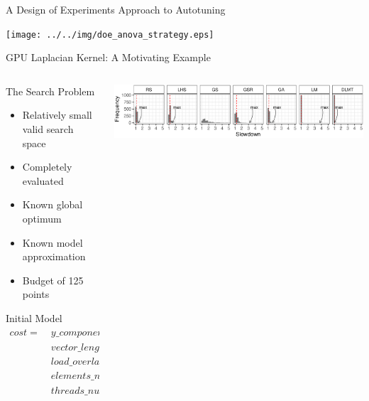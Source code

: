 \documentclass[10pt, compress, aspectratio=169, xcolor={table,usenames,dvipsnames}]{beamer}
\begin{document}
\begin{frame}[label={sec:org0b49652}]{A Design of Experiments Approach to Autotuning}
\begin{center}
\begin{center}
\texttt{[image: ../../img/doe\_anova\_strategy.eps]}
\end{center}

\vspace{-.2cm}
\end{center}
\end{frame}
\begin{frame}[label={sec:org4c4ae7e}]{GPU Laplacian Kernel: A Motivating Example}
\begin{columns}
\begin{column}{0.5\columnwidth}
\begin{block}{The Search Problem}
\begin{itemize}
\item Relatively \alert{small valid search space}
\item \alert{Completely evaluated}
\item Known \alert{global optimum}
\item Known \alert{model approximation}
\item \alert{Budget} of \alert{125 points}
\end{itemize}

\begin{block}{Initial Model}
\footnotesize
\begin{align*}
cost = & \; y\_component\_number + 1 / y\_component\_number \; + \\
& \; vector\_length + lws\_y + 1 / lws\_y \; + \\
& \; load\_overlap + temporary\_size \; + \\
& \; elements\_number + 1 / elements\_number \; + \\
& \; threads\_number + 1 / threads\_number
\end{align*}
\normalsize
\end{block}
\end{block}
\end{column}

\begin{column}{0.5\columnwidth}
\vspace{-.3cm}

\begin{center}
\begin{center}
\includegraphics[width=.88\columnwidth]{../../img/comparison_histogram.pdf}
\end{center}
\end{center}
\end{column}
\end{columns}
\end{frame}
\end{document}

